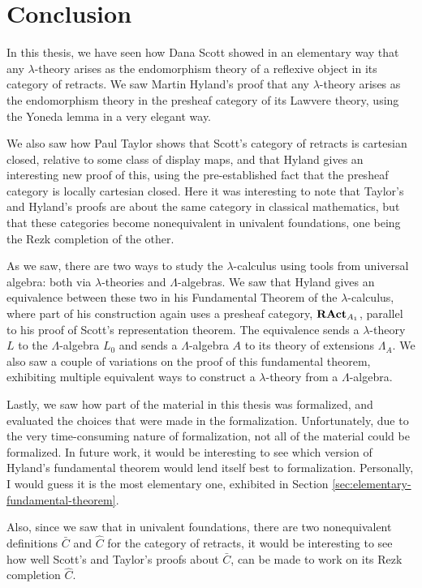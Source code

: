 \chapter{Conclusion}
In this thesis, we have seen how Dana Scott showed in an elementary way that any $ \lambda $-theory arises as the endomorphism theory of a reflexive object in its category of retracts. We saw Martin Hyland's proof that any $ \lambda $-theory arises as the endomorphism theory in the presheaf category of its Lawvere theory, using the Yoneda lemma in a very elegant way.

We also saw how Paul Taylor shows that Scott's category of retracts is cartesian closed, relative to some class of display maps, and that Hyland gives an interesting new proof of this, using the pre-established fact that the presheaf category is locally cartesian closed. Here it was interesting to note that Taylor's and Hyland's proofs are about the same category in classical mathematics, but that these categories become nonequivalent in univalent foundations, one being the Rezk completion of the other.

As we saw, there are two ways to study the $ \lambda $-calculus using tools from universal algebra: both via $ \lambda $-theories and $ \Lambda $-algebras. We saw that Hyland gives an equivalence between these two in his Fundamental Theorem of the $ \lambda $-calculus, where part of his construction again uses a presheaf category, $ \mathbf{RAct}_{A_1} $, parallel to his proof of Scott's representation theorem. The equivalence sends a $ \lambda $-theory $ L $ to the $ \Lambda $-algebra $ L_0 $ and sends a $ \Lambda $-algebra $ A $ to its theory of extensions $ \Lambda_A $. We also saw a couple of variations on the proof of this fundamental theorem, exhibiting multiple equivalent ways to construct a $ \lambda $-theory from a $ \Lambda $-algebra.

Lastly, we saw how part of the material in this thesis was formalized, and evaluated the choices that were made in the formalization. Unfortunately, due to the very time-consuming nature of formalization, not all of the material could be formalized. In future work, it would be interesting to see which version of Hyland's fundamental theorem would lend itself best to formalization. Personally, I would guess it is the most elementary one, exhibited in Section \ref{sec:elementary-fundamental-theorem}.

Also, since we saw that in univalent foundations, there are two nonequivalent definitions $ \bar C $ and $ \hat C $ for the category of retracts, it would be interesting to see how well Scott's and Taylor's proofs about $ \bar C $, can be made to work on its Rezk completion $ \hat C $.
